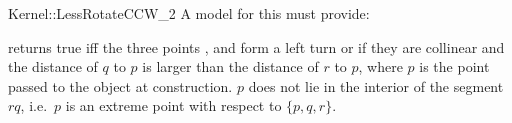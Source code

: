 \begin{ccRefFunctionObjectConcept}{Kernel::LessRotateCCW_2}
A model for this must provide:


{returns true iff the three points ,  
and  form a left turn or if they are collinear and
the distance of $q$ to $p$ is
larger than the distance of $r$ to $p$, where $p$ is the point
passed to the object at construction.
\ccPrecond $p$ does not lie in the interior of the segment $rq$,
i.e.~$p$ is an extreme point with respect to $\{p,q,r\}$.}

\end{ccRefFunctionObjectConcept}

